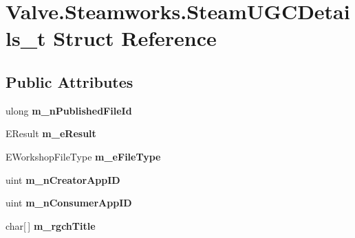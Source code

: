 \hypertarget{structValve_1_1Steamworks_1_1SteamUGCDetails__t}{}\section{Valve.\+Steamworks.\+Steam\+U\+G\+C\+Details\+\_\+t Struct Reference}
\label{structValve_1_1Steamworks_1_1SteamUGCDetails__t}
\subsection*{Public Attributes}
\begin{DoxyCompactItemize}
\item 
\hypertarget{structValve_1_1Steamworks_1_1SteamUGCDetails__t_ae06d6b0f7e452c13ec5d5fff5670f924}{}ulong {\bfseries m\+\_\+n\+Published\+File\+Id}\label{structValve_1_1Steamworks_1_1SteamUGCDetails__t_ae06d6b0f7e452c13ec5d5fff5670f924}

\item 
\hypertarget{structValve_1_1Steamworks_1_1SteamUGCDetails__t_aea9e18e3f6db0baa714874d42967eafd}{}E\+Result {\bfseries m\+\_\+e\+Result}\label{structValve_1_1Steamworks_1_1SteamUGCDetails__t_aea9e18e3f6db0baa714874d42967eafd}

\item 
\hypertarget{structValve_1_1Steamworks_1_1SteamUGCDetails__t_abf37115437c62387feeb9be6a1224e37}{}E\+Workshop\+File\+Type {\bfseries m\+\_\+e\+File\+Type}\label{structValve_1_1Steamworks_1_1SteamUGCDetails__t_abf37115437c62387feeb9be6a1224e37}

\item 
\hypertarget{structValve_1_1Steamworks_1_1SteamUGCDetails__t_a2644c2e7d41903d2be0803718025f7ed}{}uint {\bfseries m\+\_\+n\+Creator\+App\+I\+D}\label{structValve_1_1Steamworks_1_1SteamUGCDetails__t_a2644c2e7d41903d2be0803718025f7ed}

\item 
\hypertarget{structValve_1_1Steamworks_1_1SteamUGCDetails__t_a5419f84b359f2bed8fa54624628776c8}{}uint {\bfseries m\+\_\+n\+Consumer\+App\+I\+D}\label{structValve_1_1Steamworks_1_1SteamUGCDetails__t_a5419f84b359f2bed8fa54624628776c8}

\item 
\hypertarget{structValve_1_1Steamworks_1_1SteamUGCDetails__t_abfaf028062b87b6dfef45107a06512e7}{}char\mbox{[}$\,$\mbox{]} {\bfseries m\+\_\+rgch\+Title}\label{structValve_1_1Steamworks_1_1SteamUGCDetails__t_abfaf028062b87b6dfef45107a06512e7}


\end{DoxyCompactItemize}
